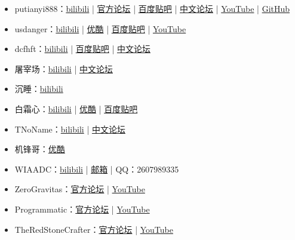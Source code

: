 \begin{itemize}
\item putianyi888：\href{https://space.bilibili.com/34937101}{bilibili} | \href{https://forums.terraria.org/index.php?members/putianyi888.121300/}{官方论坛} | \href{http://tieba.baidu.com/home/main?un=putianyi888}{百度贴吧} | \href{https://www.bbstr.net/members/putianyi888.342/}{中文论坛} | \href{https://www.youtube.com/channel/UCsG1EimffDYWXBoZRekcMIA}{YouTube} | \href{https://github.com/putianyi889}{GitHub}
\item usdanger：\href{https://space.bilibili.com/34637318/}{bilibili} | \href{http://i.youku.com/u/UMTcyMDA1MTY4}{优酷} | \href{http://tieba.baidu.com/home/main?un=us_danger}{百度贴吧} | \href{https://www.youtube.com/channel/UCh_cLX4iAbM6tAIl0zu3elw}{YouTube}
\item dcfhft：\href{https://space.bilibili.com/98605295/}{bilibili} | \href{http://tieba.baidu.com/home/main?un=dcfhft}{百度贴吧} | \href{https://www.bbstr.net/members/dcfhft.135/}{中文论坛}
\item 屠宰场：\href{https://space.bilibili.com/35610991/}{bilibili} | \href{https://www.bbstr.net/members/room.357/}{中文论坛}
\item 沉睡：\href{https://space.bilibili.com/22871583/}{bilibili}
\item 白霜心：\href{https://space.bilibili.com/49886444/}{bilibili} | \href{http://i.youku.com/u/UMTMyOTg1ODM4OA}{优酷} | \href{http://tieba.baidu.com/home/main?un=白霜心}{百度贴吧}
\item TNoName：\href{https://space.bilibili.com/14462041/}{bilibili} | \href{https://www.bbstr.net/members/tnoname.423/}{中文论坛}
\item 机锋哥：\href{http://i.youku.com/u/UMjg3MTI2NDcwOA}{优酷}
\item WIAADC：\href{https://space.bilibili.com/398780730}{bilibili} | \href{mailto:williamadcakc@outlook.com}{邮箱} | QQ：2607989335
\item ZeroGravitas：\href{https://forums.terraria.org/index.php?members/zerogravitas.96/}{官方论坛} | \href{https://www.youtube.com/channel/UCyLQbVwYleCYzgl49dNAeOw}{YouTube}
\item Programmatic：\href{https://forums.terraria.org/index.php?members/programmatic.37545/}{官方论坛} | \href{https://www.youtube.com/channel/UCWGTYKTR5Kw3cDhyd2vIDew}{YouTube}
\item TheRedStoneCrafter：\href{https://forums.terraria.org/index.php?members/idkwhoiam129.57457/}{官方论坛} | \href{https://www.youtube.com/channel/UC9ekQoOvO3BgFQsmGdWJpCQ}{YouTube}

\end{itemize}
